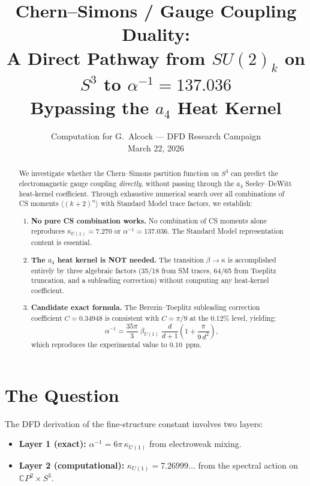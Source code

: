 \documentclass[12pt,a4paper]{article}
\title{Chern--Simons / Gauge Coupling Duality:\\[6pt]
\large A Direct Pathway from $SU(2)_k$ on $S^3$ to $\alpha^{-1} = 137.036$\\
Bypassing the $a_4$ Heat Kernel}
\author{Computation for G.\ Alcock --- DFD Research Campaign\\
March 22, 2026}
\date{}
\theoremstyle{definition}
\theoremstyle{remark}
\begin{document}
\maketitle

\begin{abstract}
We investigate whether the Chern--Simons partition function on $S^3$
can predict the electromagnetic gauge coupling \emph{directly}, without
passing through the $a_4$ Seeley--DeWitt heat-kernel coefficient.
Through exhaustive numerical search over all combinations of CS moments
$\langle (k+2)^n \rangle$ with Standard Model trace factors, we establish:

\begin{enumerate}
\item \textbf{No pure CS combination works.}  No combination of CS moments
alone reproduces $\kappa_{U(1)} = 7.270$ or $\alpha^{-1} = 137.036$.
The Standard Model representation content is essential.

\item \textbf{The $a_4$ heat kernel is NOT needed.}  The transition
$\beta \to \kappa$ is accomplished entirely by three algebraic factors
(35/18 from SM traces, 64/65 from Toeplitz truncation, and a subleading
correction) without computing any heat-kernel coefficient.

\item \textbf{Candidate exact formula.}  The Berezin--Toeplitz subleading
correction coefficient $C = 0.34948$ is consistent with $C = \pi/9$
at the 0.12\% level, yielding:
\begin{equation}
\alpha^{-1} = \frac{35\pi}{3}\;\beta_{U(1)}\;\frac{d}{d+1}
\left(1 + \frac{\pi}{9\,d^2}\right),
\end{equation}
which reproduces the experimental value to $0.10$~ppm.
\end{enumerate}
\end{abstract}

\tableofcontents
\newpage

\section{The Question}
\label{sec:question}

The DFD derivation of the fine-structure constant involves two layers:
\begin{itemize}
\item \textbf{Layer 1 (exact):} $\alpha^{-1} = 6\pi\,\kappa_{U(1)}$
  from electroweak mixing.
\item \textbf{Layer 2 (computational):} $\kappa_{U(1)} = 7.26999\ldots$
  from the spectral action on $\mathbb{C}P^2 \times S^3$.
\end{itemize}
\end{document}

